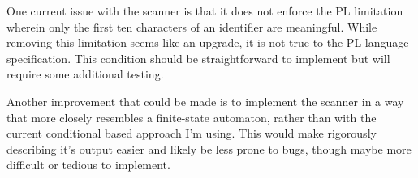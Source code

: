 \documentclass{article}
\begin{document}
        One current issue with the scanner is that it does not enforce the PL limitation wherein only the first ten characters of an identifier are meaningful. While removing this limitation seems like an upgrade, it is not true to the PL language specification. This condition should be straightforward to implement but will require some additional testing.

        Another improvement that could be made is to implement the scanner in a way that more closely resembles a finite-state automaton, rather than with the current conditional based approach I'm using. This would make rigorously describing it's output easier and likely be less prone to bugs, though maybe more difficult or tedious to implement.
\end{document}

